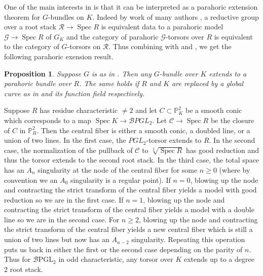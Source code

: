 \documentclass{amsart}
\newtheorem{proposition}[proposition]{Proposition}
\theoremstyle{definition}
\newenvironment{example}
  {\pushQED{\qed}\renewcommand{\qedsymbol}{$\diamondsuit$}\examplex}
  {\popQED\endexamplex}
\newcommand{\bP}{\mathbb{P}}
\newcommand{\cG}{\mathcal{G}}
\newcommand{\cB}{\mathcal{B}}
\newcommand{\cC}{\mathcal{C}}
\newcommand{\cR}{\mathcal{R}}
\newcommand{\spec}{\operatorname{Spec}}
\begin{document}
One of the main interests in  is that it can be interpreted as a parahoric extension theorem for $G$-bundles on $K$. Indeed by work of many authors \cite{balaji_seshadri, pappas_rapoport, MR4703674, gs_parahoric} \cite[Section 5]{sheng2024nonabelianhodgecorrespondenceprincipal}, a reductive group over a root stack $\cR \to \spec R$ is equivalent data to a parahoric model $\cG \to \spec R$ of $G_K$ and the category of parahoric $\cG$-torsors over $R$ is equivalent to the category of $G$-torsors on $\cR$. Thus combining  with  and , we get the following parahoric exension result. 

\begin{proposition}
    Suppose $G$ is as in . Then any $G$-bundle over $K$ extends to a parahoric bundle over $R$. The same holds if $R$ and $K$ are replaced by a global curve as in  and its function field respectively. 
\end{proposition}

\begin{example}\label{ex:conic_tame}
Suppose $R$  has residue characteristic $\neq 2$ and let $C \subset \mathbb{P}^2_K$ be a smooth conic which corresponds to a map $\spec K \to \cB PGL_2$. Let $\cC \to \spec R$ be the closure of $C$ in $\bP^2_R$. Then the central fiber is either a smooth conic, a doubled line, or a union of two lines. In the first case, the $PGL_2$-torsor extends to $R$. In the second case, the normalization of the pullback of $\cC$ to $\sqrt[2]{\spec R}$ has good reduction and thus the torsor extends to the second root stack. In the third case, the total space has an $A_n$ singularity at the node of the central fiber for some $n \geq 0$ (where by convention we an $A_0$ singularity is a regular point). If $n = 0$, blowing up the node and contracting the strict transform of the central fiber yields a model with good reduction so we are in the first case. If $n = 1$, blowing up the node and contracting the strict transform of the central fiber yields a model with a double line so we are in the second case. For $n \geq 2$, blowing up the node and contracting the strict transform of the central fiber yields a new central fiber which is still a union of two lines but now has an $A_{n-2}$ singularity. Repeating this operation puts us back in either the first or the second case depending on the parity of $n$. Thus for $\cB \mathrm{PGL}_2$ in odd characteristic, any torsor over $K$ extends up to a degree $2$ root stack. 
\end{example}
\end{document}
